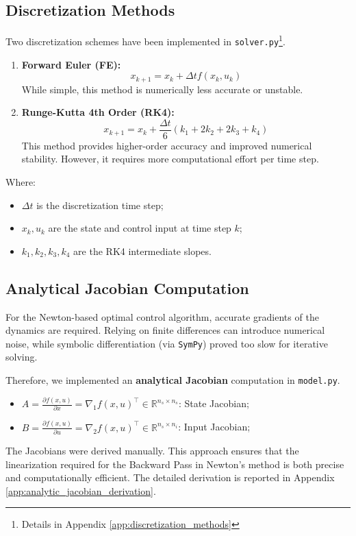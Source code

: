 \subsection{Discretization Methods}
Two discretization schemes have been implemented in \texttt{solver.py}\footnote{Details in Appendix \ref{app:discretization_methods}}.
\begin{enumerate}
      \item \textbf{Forward Euler (FE):} 
            \begin{equation}
                  x_{k+1} = x_k + \Delta t f(x_k, u_k)
            \end{equation}
            While simple, this method is numerically less accurate or unstable.
      \item \textbf{Runge-Kutta 4th Order (RK4):}
            \begin{equation}
                  x_{k+1} = x_k + \frac{\Delta t}{6} (k_1 + 2k_2 + 2k_3 + k_4)
            \end{equation}
            This method provides higher-order accuracy and improved numerical stability. However, it requires more computational effort per time step.

\end{enumerate}
Where:
\begin{itemize}
      \item $\Delta t$ is the discretization time step;
      \item $x_k, u_k$ are the state and control input at time step $k$;
      \item $k_1, k_2, k_3, k_4$ are the RK4 intermediate slopes.
\end{itemize}

\subsection{Analytical Jacobian Computation}
For the Newton-based optimal control algorithm, accurate gradients of the dynamics are required. Relying on finite differences can introduce numerical noise, while symbolic differentiation (via \texttt{SymPy}) proved too slow for iterative solving.

Therefore, we implemented an \textbf{analytical Jacobian} computation in \texttt{model.py}. 
\begin{itemize}
      \item $A = \frac{\partial f(x, u)}{\partial x} = \nabla_1 f(x, u)^\top \in \mathbb{R}^{n_s \times n_s}$: State Jacobian;
      \item $B = \frac{\partial f(x, u)}{\partial u} = \nabla_2 f(x, u)^\top \in \mathbb{R}^{n_s \times n_i}$: Input Jacobian;
\end{itemize}

The Jacobians were derived manually. This approach ensures that the linearization required for the Backward Pass in Newton's method is both precise and computationally efficient.
The detailed derivation is reported in Appendix \ref{app:analytic_jacobian_derivation}.

\newpage